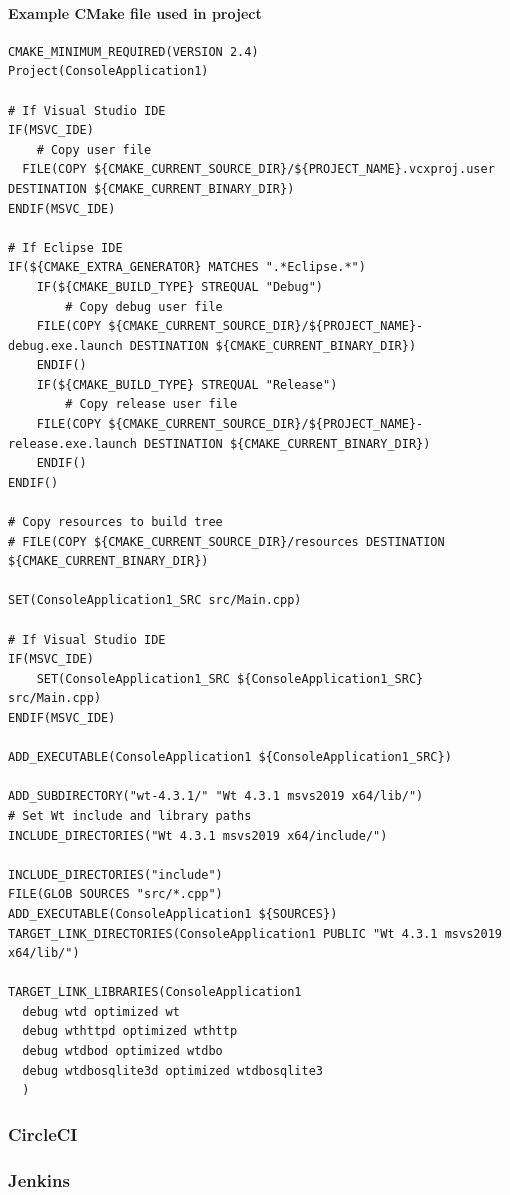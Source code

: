 \documentclass[a4paper,12pt]{article}
\begin{document}
\paragraph{Example CMake file used in project}
\begin{verbatim}
CMAKE_MINIMUM_REQUIRED(VERSION 2.4)
Project(ConsoleApplication1)

# If Visual Studio IDE
IF(MSVC_IDE)
	# Copy user file
  FILE(COPY ${CMAKE_CURRENT_SOURCE_DIR}/${PROJECT_NAME}.vcxproj.user DESTINATION ${CMAKE_CURRENT_BINARY_DIR})
ENDIF(MSVC_IDE)

# If Eclipse IDE
IF(${CMAKE_EXTRA_GENERATOR} MATCHES ".*Eclipse.*")
	IF(${CMAKE_BUILD_TYPE} STREQUAL "Debug")
		# Copy debug user file
    FILE(COPY ${CMAKE_CURRENT_SOURCE_DIR}/${PROJECT_NAME}-debug.exe.launch DESTINATION ${CMAKE_CURRENT_BINARY_DIR})
	ENDIF()
	IF(${CMAKE_BUILD_TYPE} STREQUAL "Release")
		# Copy release user file
    FILE(COPY ${CMAKE_CURRENT_SOURCE_DIR}/${PROJECT_NAME}-release.exe.launch DESTINATION ${CMAKE_CURRENT_BINARY_DIR})
	ENDIF()
ENDIF()

# Copy resources to build tree
# FILE(COPY ${CMAKE_CURRENT_SOURCE_DIR}/resources DESTINATION ${CMAKE_CURRENT_BINARY_DIR})

SET(ConsoleApplication1_SRC src/Main.cpp)

# If Visual Studio IDE
IF(MSVC_IDE)
	SET(ConsoleApplication1_SRC ${ConsoleApplication1_SRC} src/Main.cpp)
ENDIF(MSVC_IDE)

ADD_EXECUTABLE(ConsoleApplication1 ${ConsoleApplication1_SRC})

ADD_SUBDIRECTORY("wt-4.3.1/" "Wt 4.3.1 msvs2019 x64/lib/")
# Set Wt include and library paths
INCLUDE_DIRECTORIES("Wt 4.3.1 msvs2019 x64/include/")

INCLUDE_DIRECTORIES("include")
FILE(GLOB SOURCES "src/*.cpp")
ADD_EXECUTABLE(ConsoleApplication1 ${SOURCES})
TARGET_LINK_DIRECTORIES(ConsoleApplication1 PUBLIC "Wt 4.3.1 msvs2019 x64/lib/")

TARGET_LINK_LIBRARIES(ConsoleApplication1
  debug wtd optimized wt
  debug wthttpd optimized wthttp
  debug wtdbod optimized wtdbo
  debug wtdbosqlite3d optimized wtdbosqlite3
  )
\end{verbatim}
\subsubsection{CircleCI}
\subsubsection{Jenkins}
\end{document}
